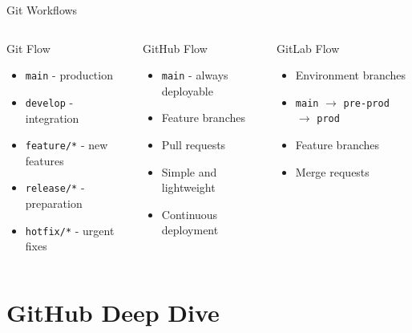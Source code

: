\documentclass[aspectratio=169]{beamer}
\begin{document}
	\begin{frame}{Git Workflows}
		\begin{columns}[T]
			\begin{block}{Git Flow}
				\begin{itemize}
					\item \texttt{main} - production
					\item \texttt{develop} - integration
					\item \texttt{feature/*} - new features
					\item \texttt{release/*} - preparation
					\item \texttt{hotfix/*} - urgent fixes
				\end{itemize}
			\end{block}
			
			\begin{block}{GitHub Flow}
				\begin{itemize}
					\item \texttt{main} - always deployable
					\item Feature branches
					\item Pull requests
					\item Simple and lightweight
					\item Continuous deployment
				\end{itemize}
			\end{block}
			
			\begin{block}{GitLab Flow}
				\begin{itemize}
					\item Environment branches
					\item \texttt{main} $\rightarrow$ \texttt{pre-prod} $\rightarrow$ \texttt{prod}
					\item Feature branches
					\item Merge requests
				\end{itemize}
			\end{block}
		\end{columns}
	\end{frame}
	
	\section{GitHub Deep Dive}
	
\end{document}
